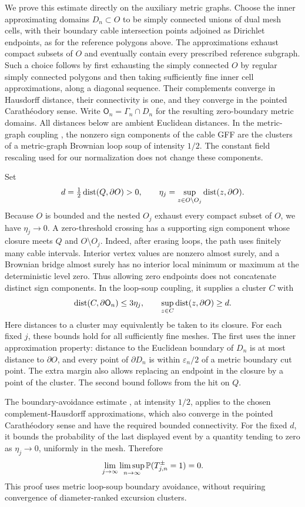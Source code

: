 We prove this estimate directly on the auxiliary metric graphs.
Choose the inner approximating domains \(D_n\subset O\) to be simply
connected unions of dual mesh cells, with their boundary cable
intersection points adjoined as Dirichlet endpoints, as for the
reference polygons above.  The approximations exhaust compact subsets
of \(O\) and eventually contain every prescribed reference subgraph.
Such a choice follows by first exhausting the simply connected \(O\)
by regular simply connected polygons and then taking sufficiently fine
inner cell approximations, along a diagonal sequence.  Their complements
converge in Hausdorff distance, their connectivity is one, and they
converge in the pointed Carath\'eodory sense.  Write
\(\mathsf O_n=\Gamma_n\cap D_n\) for the resulting zero-boundary metric
domains.  All distances below are ambient Euclidean distances.  In the
metric-graph coupling
\cite[Section~2.3 and Proposition~2.4, with zero boundary data]{ALS2018},
the nonzero sign components of the cable GFF are the clusters of a
metric-graph Brownian loop soup of intensity \(1/2\).  The constant
field rescaling used for our normalization does not change these
components.

Set
\[
 d=\tfrac12\dist(Q,\partial O)>0,\qquad
 \eta_j=\sup_{z\in O\setminus O_j}\dist(z,\partial O).
\]
Because \(O\) is bounded and the nested \(O_j\) exhaust every compact
subset of \(O\), we have \(\eta_j\to0\).  A zero-threshold crossing
has a supporting sign component whose closure meets \(Q\) and
\(O\setminus O_j\).  Indeed, after erasing loops, the path uses finitely
many cable intervals.  Interior vertex values are nonzero almost surely,
and a Brownian bridge almost surely has no interior local minimum or
maximum at the deterministic level zero.  Thus allowing zero endpoints
does not concatenate distinct sign components.  In the loop-soup
coupling, it supplies a cluster \(C\) with
\[
 \dist(C,\partial\mathsf O_n)\le 3\eta_j,
 \qquad \sup_{z\in C}\dist(z,\partial O)\ge d.
\]
Here distances to a cluster may equivalently be taken to its closure.
For each fixed \(j\), these bounds hold for all sufficiently fine
meshes.  The first uses the inner approximation property: distance
to the Euclidean boundary of \(D_n\) is at most distance to
\(\partial O\), and every point of \(\partial D_n\) is within
\(\varepsilon_n/2\) of a metric boundary cut point.  The extra margin also
allows replacing an endpoint in the closure by a point of the cluster.
The second bound follows from the hit on \(Q\).

The boundary-avoidance estimate
\cite[Lemma~4.13]{ALS2018}, at intensity \(1/2\), applies to the
chosen complement-Hausdorff approximations, which also converge in
the pointed Carath\'eodory sense and have the required bounded
connectivity.  For the fixed \(d\), it bounds the probability of the
last displayed event by a quantity tending to zero as
\(\eta_j\to0\), uniformly in the mesh.  Therefore
\[
 \lim_{j\to\infty}\limsup_{n\to\infty}
 \P(T_{j,n}^{\pm}=1)=0.
\]
This proof uses metric loop-soup boundary avoidance, without requiring
convergence of diameter-ranked excursion clusters.

